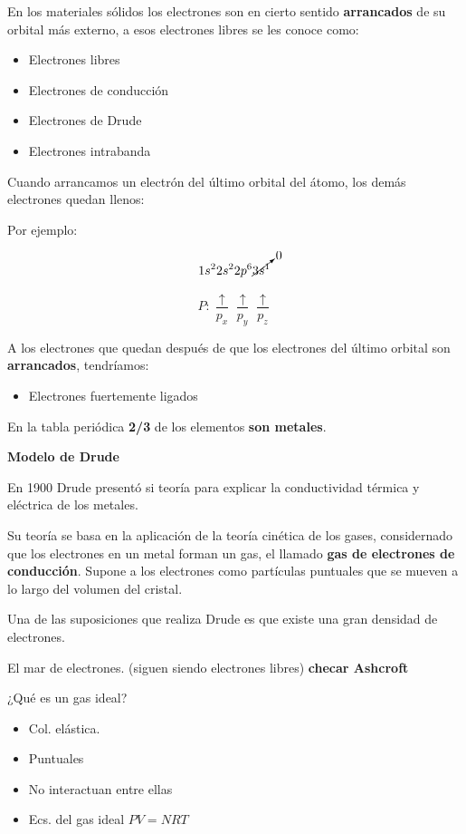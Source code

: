 \documentclass{article}
\begin{document}
En los materiales sólidos los electrones son en cierto sentido \textbf{arrancados} de su orbital más externo, a esos electrones libres se les conoce como:

\begin{itemize}
\item Electrones libres\\
\item Electrones de conducción\\
\item Electrones de Drude
\item Electrones intrabanda
\end{itemize}

Cuando arrancamos un electrón del último orbital del átomo, los demás electrones quedan llenos:

Por ejemplo:

\[ 1s^{2}2s^{2}2p^{6} \cancelto{0}{3s^{1}}   \]

 \[  P: \frac{\uparrow  }{p_{x}} \frac{\uparrow  }{p_{y}} \frac{\uparrow  }{p_{z}}   \]
 
 A los electrones que quedan después de que los electrones del último orbital son \textbf{arrancados}, tendríamos:
 
 \begin{itemize}
 \item Electrones fuertemente ligados
 \end{itemize}


En la tabla periódica \textbf{2/3} de los elementos \textbf{son metales}. 


\textbf{Modelo de Drude}

En 1900 Drude presentó si teoría para explicar la conductividad térmica y eléctrica de los metales.

Su teoría se basa en la aplicación de la teoría cinética de los gases, considernado que los electrones en un metal forman un gas, el llamado \textbf{gas de electrones de conducción}. Supone a los electrones como partículas puntuales que se mueven a lo largo del volumen del cristal. 

Una de las suposiciones que realiza Drude es que existe una gran densidad de electrones. 


El mar de electrones. (siguen siendo electrones libres) \textbf{checar Ashcroft}

¿Qué es un gas ideal?


\begin{itemize}
\item Col. elástica.
\item Puntuales
\item No interactuan entre ellas
\item Ecs. del gas ideal $PV=NRT$
\end{itemize}
\end{document}
